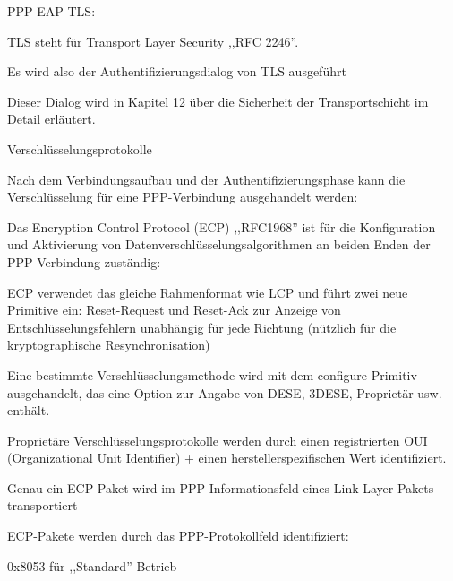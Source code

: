 \documentclass[a4paper]{article}
\begin{document}
\begin{multicols}{3}
\begin{itemize*}
            \item PPP-EAP-TLS:
            \begin{itemize*}
                  \item TLS steht für Transport Layer Security ,,RFC 2246''.
                  \item Es wird also der Authentifizierungsdialog von TLS ausgeführt
                  \item Dieser Dialog wird in Kapitel 12 über die Sicherheit der Transportschicht im Detail erläutert.
            \end{itemize*}
      \end{itemize*}

      Verschlüsselungsprotokolle
      \begin{itemize*}
            \item Nach dem Verbindungsaufbau und der Authentifizierungsphase kann die Verschlüsselung für eine PPP-Verbindung ausgehandelt werden:
            \begin{itemize*}
                  \item Das Encryption Control Protocol (ECP) ,,RFC1968'' ist für die Konfiguration und Aktivierung von Datenverschlüsselungsalgorithmen an beiden Enden der PPP-Verbindung zuständig:
                  \begin{itemize*}
                        \item ECP verwendet das gleiche Rahmenformat wie LCP und führt zwei neue Primitive ein: Reset-Request und Reset-Ack zur Anzeige von Entschlüsselungsfehlern unabhängig für jede Richtung (nützlich für die kryptographische Resynchronisation)
                        \item Eine bestimmte Verschlüsselungsmethode wird mit dem configure-Primitiv ausgehandelt, das eine Option zur Angabe von DESE, 3DESE, Proprietär usw. enthält.
                        \item Proprietäre Verschlüsselungsprotokolle werden durch einen registrierten OUI (Organizational Unit Identifier) + einen herstellerspezifischen Wert identifiziert.
                        \item Genau ein ECP-Paket wird im PPP-Informationsfeld eines Link-Layer-Pakets transportiert
                        \item ECP-Pakete werden durch das PPP-Protokollfeld identifiziert:
                        \begin{itemize*}
                              \item 0x8053 für ,,Standard'' Betrieb

\end{itemize*}
\end{itemize*}
\end{itemize*}
\end{itemize*}
\end{multicols}
\end{document}
